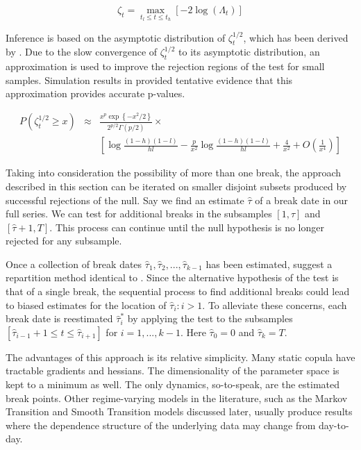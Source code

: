 \documentclass[12pt]{article}
\begin{document}
\begin{equation}
	\zeta_{t}=\max_{t_{l}\leq t\leq t_{h}}\left[ -2\log \left( \Lambda _{t}\right)\right]
\end{equation}

Inference is based on the asymptotic distribution of $\zeta_{t}^{1/2}$, which has been derived by \cite{Csorgo_and_Horvath_1997}. Due to the slow convergence of $\zeta_{t}^{1/2}$ to its asymptotic distribution, an approximation is used to improve the rejection regions of the test for small samples. Simulation results in \cite{Dias_and_Embrechts_2004} provided tentative evidence that this approximation provides accurate p-values.

\begin{eqnarray}
P\left(\zeta_{t}^{1/2} \geq x\right) &\approx& \frac{x^{p} \exp\left\{-x^{2}/2\right\}}{2^{p/2}\Gamma \left(p/2\right)} \times  \\
                                 && \left[\log \frac{\left(1-h\right) \left(1-l\right)}{hl} - \frac{p}{x^{2}}\log \frac{\left(1-h\right)\left(1-l\right)}{hl} + \frac{4}{x^{2}} + O \left(\frac{1}{x^{4}}\right)\right]
\end{eqnarray}

Taking into consideration the possibility of more than one break, the approach described in this section can be iterated on smaller disjoint subsets produced by successful rejections of the null. Say we find an estimate $\hat{\tau}$ of a break date in our full series. We can test for additional breaks in the subsamples $\left[1, \hat{\tau}\right]$ and $\left[\hat{\tau} + 1, T\right]$. This process can continue until the null hypothesis is no longer rejected for any subsample.

Once a collection of break dates $\hat{\tau}_{1},\hat{\tau}_{2},...,\hat{\tau}_{k-1}$ has been estimated, \cite{Dias_and_Embrechts_2009} suggest a repartition method identical to \cite{Bai_1997}. Since the alternative hypothesis of the test is that of a single break, the sequential process to find additional breaks could lead to biased estimates for the location of $\hat{\tau}_{i}:i > 1$. To alleviate these concerns, each break date is reestimated $\hat{\tau}_{i}^{\ast}$ by applying the test to the subsamples $\left[ \hat{\tau}_{i-1}+1\leq t\leq \hat{\tau}_{i+1}\right]$ for $i=1,...,k-1$. Here $\hat{\tau}_{0} = 0$ and $\hat{\tau}_{k} = T$.

The advantages of this approach is its relative simplicity. Many static copula have tractable gradients and hessians. The dimensionality of the parameter space is kept to a minimum as well. The only dynamics, so-to-speak, are the estimated break points. Other regime-varying models in the literature, such as the Markov Transition and Smooth Transition models discussed later, usually produce results where the dependence structure of the underlying data may change from day-to-day.
\end{document}
